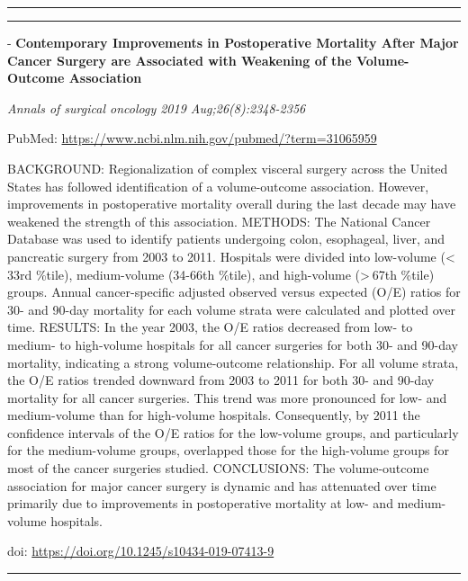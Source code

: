 \documentclass[]{article}
\begin{document}
\begin{center}\rule{0.5\linewidth}{\linethickness}\end{center}

\begin{center}\rule{0.5\linewidth}{\linethickness}\end{center}

 - \textbf{Contemporary Improvements in Postoperative Mortality After
Major Cancer Surgery are Associated with Weakening of the Volume-Outcome
Association}

\emph{Annals of surgical oncology 2019 Aug;26(8):2348-2356}

PubMed: \url{https://www.ncbi.nlm.nih.gov/pubmed/?term=31065959}

BACKGROUND: Regionalization of complex visceral surgery across the
United States has followed identification of a volume-outcome
association. However, improvements in postoperative mortality overall
during the last decade may have weakened the strength of this
association. METHODS: The National Cancer Database was used to identify
patients undergoing colon, esophageal, liver, and pancreatic surgery
from 2003 to 2011. Hospitals were divided into low-volume
(\textless{} 33rd \%tile), medium-volume (34-66th \%tile), and
high-volume (\textgreater{} 67th \%tile) groups. Annual cancer-specific
adjusted observed versus expected (O/E) ratios for 30- and 90-day
mortality for each volume strata were calculated and plotted over time.
RESULTS: In the year 2003, the O/E ratios decreased from low- to medium-
to high-volume hospitals for all cancer surgeries for both 30- and
90-day mortality, indicating a strong volume-outcome relationship. For
all volume strata, the O/E ratios trended downward from 2003 to 2011 for
both 30- and 90-day mortality for all cancer surgeries. This trend was
more pronounced for low- and medium-volume than for high-volume
hospitals. Consequently, by 2011 the confidence intervals of the O/E
ratios for the low-volume groups, and particularly for the medium-volume
groups, overlapped those for the high-volume groups for most of the
cancer surgeries studied. CONCLUSIONS: The volume-outcome association
for major cancer surgery is dynamic and has attenuated over time
primarily due to improvements in postoperative mortality at low- and
medium-volume hospitals.

doi: \url{https://doi.org/10.1245/s10434-019-07413-9}

{}

{}

\begin{center}\rule{0.5\linewidth}{\linethickness}\end{center}
\end{document}
